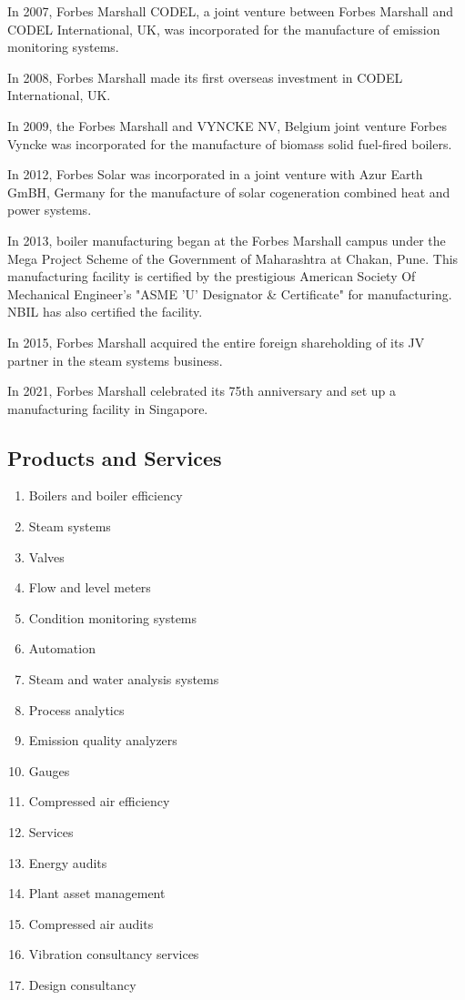 In 2007, Forbes Marshall CODEL, a joint venture between Forbes Marshall and CODEL International, UK, was incorporated for the manufacture of emission monitoring systems.

In 2008, Forbes Marshall made its first overseas investment in CODEL International, UK.

In 2009, the Forbes Marshall and VYNCKE NV, Belgium joint venture Forbes Vyncke was incorporated for the manufacture of biomass solid fuel-fired boilers.

In 2012, Forbes Solar was incorporated in a joint venture with Azur Earth GmBH, Germany for the manufacture of solar cogeneration combined heat and power systems.

In 2013, boiler manufacturing began at the Forbes Marshall campus under the Mega Project Scheme of the Government of Maharashtra at Chakan, Pune. This manufacturing facility is certified by the prestigious American Society Of Mechanical Engineer's "ASME 'U' Designator \& Certificate" for manufacturing. NBIL has also certified the facility.

In 2015, Forbes Marshall acquired the entire foreign shareholding of its JV partner in the steam systems business.

In 2021, Forbes Marshall celebrated its 75th anniversary and set up a manufacturing facility in Singapore.


\subsection{Products and Services}
\begin{enumerate}
    \item Boilers and boiler efficiency
    \item Steam systems
    \item Valves
    \item Flow and level meters
    \item Condition monitoring systems
    \item Automation
    \item Steam and water analysis systems
    \item Process analytics
    \item Emission quality analyzers
    \item Gauges
    \item Compressed air efficiency
    \item Services
    \item Energy audits
    \item Plant asset management
    \item Compressed air audits
    \item Vibration consultancy services
    \item Design consultancy
\end{enumerate}


